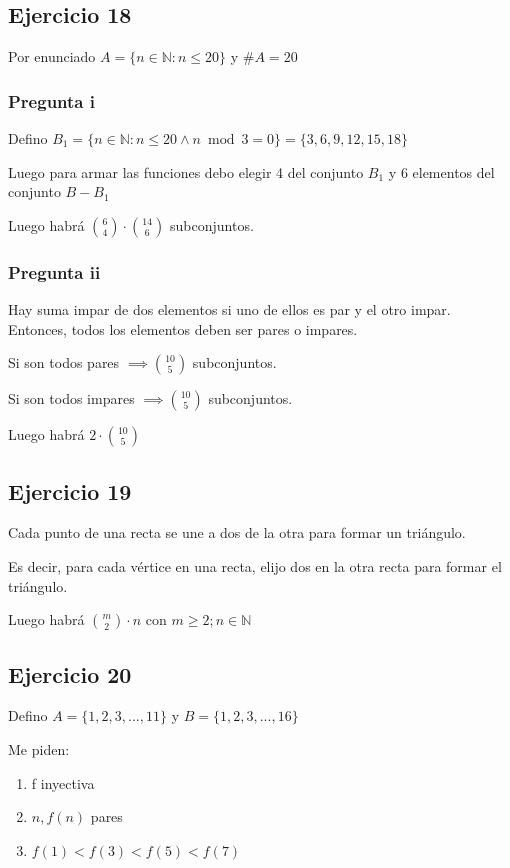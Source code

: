 \subsection{Ejercicio 18}
Por enunciado $A = \{ n \in \mathbb{N}: n \leq 20 \}$ y $\#A = 20$

\subsubsection{Pregunta i}
Defino $B_1 = \{ n \in \mathbb{N}: n \leq 20 \wedge n \bmod 3 = 0 \} = \{ 3,6,9,12,15,18 \}$

Luego para armar las funciones debo elegir 4 del conjunto $B_1$ y 6 elementos del conjunto $B - B_1$

Luego habrá $ \binom{6}{4} \cdot \binom{14}{6} $ subconjuntos.

\subsubsection{Pregunta ii}
Hay suma impar de dos elementos si uno de ellos es par y el otro impar. Entonces, todos los elementos deben ser pares o impares.

Si son todos pares $ \implies \binom{10}{5} $ subconjuntos.

Si son todos impares $ \implies \binom{10}{5} $ subconjuntos.

Luego habrá $ 2 \cdot \binom{10}{5} $

\subsection{Ejercicio 19}
Cada punto de una recta se une a dos de la otra para formar un triángulo. 

Es decir, para cada vértice en una recta, elijo dos en la otra recta para formar el triángulo.

Luego habrá $ \binom{m}{2} \cdot n $ con $ m \geq 2; n\in \mathbb{N} $

\subsection{Ejercicio 20}
Defino $ A = \{ 1,2,3,...,11 \} $ y $ B = \{ 1,2,3,...,16 \} $

Me piden:
\begin{enumerate}
    \item f inyectiva
    \item $ n, f(n) $ pares
    \item $ f(1) < f(3) < f(5) < f(7) $
\end{enumerate}

